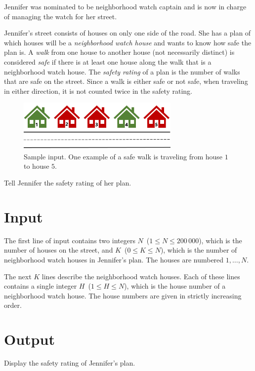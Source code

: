 
Jennifer was nominated to be neighborhood watch captain and is now in charge of managing the watch for her street. 

Jennifer's street consists of houses on only one side of the road. She has a plan of which houses will be a \textit{neighborhood watch house} and wants to know how safe the plan is. A \textit{walk} from one house to another house (not necessarily distinct) is considered \textit{safe} if there is at least one house along the walk that is a neighborhood watch house. The \textit{safety rating} of a plan is the number of walks that are safe on the street. Since a walk is either safe or not safe, when traveling in either direction, it is not counted twice in the safety rating.

\begin{figure}[h]
\begin{center}
 \includegraphics[width=0.7\textwidth]{houses}
 \caption{Sample input. One example of a safe walk is traveling from house $1$ to house $5$.
}
\end{center}
\end{figure}

Tell Jennifer the safety rating of her plan.

\section*{Input}

The first line of input contains two integers $N$~($1 \leq N \leq 200\,000$), which is the number of houses on the street, and $K$~($0 \leq K \leq N$), which is the number of neighborhood watch houses in Jennifer's plan. The houses are numbered $1, \dots , N$.

The next $K$ lines describe the neighborhood watch houses. Each of these lines contains a single integer $H$~($1 \leq H \leq N$), which is the house number of a neighborhood watch house. The house numbers are given in strictly increasing order.

\section*{Output}

Display the safety rating of Jennifer's plan.
